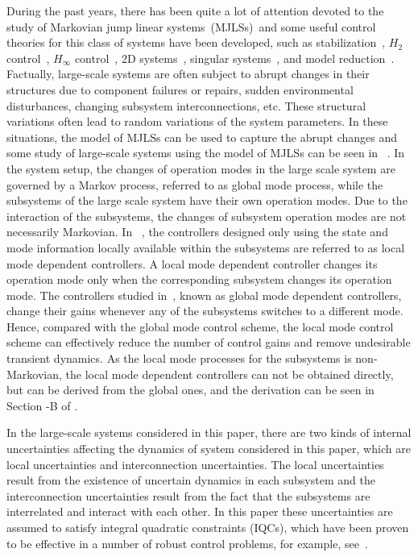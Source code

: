 \documentclass[11pt,draftcls,onecolumn]{IEEEtran}
\begin{document}
 During the past years, there has been quite a lot of attention devoted to the study of  Markovian jump linear systems~(MJLSs)~and some useful control theories for this class of systems have been developed, such as stabilization~\cite{Farias1992,Ma2009,Feng1992}, $H_2$ control~\cite{xiong2009},  $H_{\infty}$ control~\cite{Fagoso1993,Li2007,Zhang2009}, 2D systems~\cite{Wu2012H2,Wu2008}, singular systems~\cite{Wu2012L2,Wu2010}, and model reduction~\cite{Zhang2008}. Factually, large-scale systems are often subject to abrupt  changes in their structures due to component failures or repairs, sudden environmental disturbances, changing subsystem interconnections, etc. These structural variations often lead to random variations of the system parameters. In these situations, the model of MJLSs can be used  to capture the abrupt changes and some study of large-scale systems  using the model of MJLSs can be seen in ~\cite{Ugrinovskii2005,Xiong2009,Xiong2010,li2007}.  In the system setup, the changes of operation modes in the large scale system are governed by a
Markov process, referred to as  global mode process, while the subsystems of the large scale system have their own operation modes.
 Due to the interaction of the subsystems, the changes of subsystem operation modes are not necessarily Markovian.  In ~\cite{Xiong2009,Xiong2010}, the controllers  designed only using the state and mode information locally available within the subsystems are referred to as local mode dependent controllers. A local mode dependent controller changes its operation mode only when the corresponding subsystem changes its operation mode. The  controllers studied in~\cite{Ugrinovskii2005,li2007}, known as global mode dependent controllers, change their gains whenever any of the subsystems switches to a different mode.  Hence, compared with the global mode control scheme, the local mode control scheme can effectively reduce the number of control gains  and remove undesirable transient dynamics.   As  the local  mode processes for the subsystems is non-Markovian, the local mode dependent controllers can not be obtained directly, but can be derived from the global ones, and the derivation can be seen in Section \uppercase\expandafter{}-B of \cite{Xiong2009}.

 In the large-scale systems considered in this paper, there are two kinds of internal uncertainties  affecting the dynamics of system considered in this paper, which are local uncertainties and interconnection uncertainties. The local uncertainties  result from the existence of uncertain dynamics in each subsystem and the interconnection uncertainties  result from the fact that the subsystems are interrelated and interact with each other. In this paper these uncertainties are assumed to satisfy integral quadratic constraints (IQCs), which have been proven to be effective in a number of robust control problems, for example, see~\cite{Ugrinovskii2005,Petersen2006,li2007}.
\end{document}
